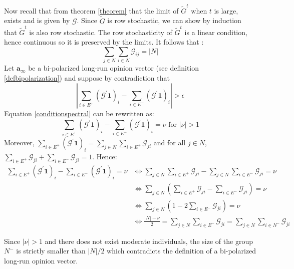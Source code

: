 \documentclass{article}
\begin{document}
\noindent Now recall that from theorem \ref{theorem} that the limit of $\tilde{G}^t$ when $t$ is large, exists and is given by $\mathcal{G}$. Since $\tilde{G}$ is row stochastic, we can show by induction that $\tilde{G}^t$ is also row stochastic. The row stochasticity of $\tilde{G}^t$ is a linear condition, hence continuous so it is preserved by the limits. It follows that : 
\begin{equation}
\sum_{j \in N} \sum_{i \in N} \mathcal{G}_{ij} = |N|
\label{sumone}
\end{equation}
Let $\mathbf{a}_{\infty}$ be a bi-polarized long-run opinion vector (see definition \ref{defbipolarization})  and suppose by contradiction that 
\begin{equation}
|\sum_{i \in E^{+}} (\mathcal{G}^{'} \mathbf{1})_{i} - \sum_{i \in E^{-}} (\mathcal{G}^{'} \mathbf{1})_{i}  | > \epsilon
\label{conditionspectral}
\end{equation} 
Equation \eqref{conditionspectral} can be rewritten as: 
\begin{equation*}  \sum_{i \in E^{+}} (\mathcal{G}^{'} \mathbf{1})_{i} - \sum_{i \in E^{-}} (\mathcal{G}^{'} \mathbf{1})_{i} = \nu \mbox{ for } |\nu| > 1 
\label{rewriteconditionspectral} \end{equation*}
Moreover, $ \sum_{i \in E^{+}} (\mathcal{G}^{'} \mathbf{1})_{i} = \sum_{j \in N} \sum_{i \in E^{+}} \mathcal{G}_{ji} $ and for all $j \in N$, $\sum_{i \in E^{+}} \mathcal{G}_{ji}  + \sum_{i \in E^{-}} \mathcal{G}_{ji} =1$. Hence: 
\begin{align*}
 \sum_{i \in E^{+}} (\mathcal{G}^{'} \mathbf{1})_{i} - \sum_{i \in E^{-}} (\mathcal{G}^{'} \mathbf{1})_{i} = \nu  & \Leftrightarrow    \sum_{j \in N} \sum_{i \in E^{+}} \mathcal{G}_{ji} - \sum_{j \in N} \sum_{i \in E^{-}} \mathcal{G}_{ji} = \nu \\
& \Leftrightarrow   \sum_{j \in N} ( \sum_{i \in E^{+}} \mathcal{G}_{ji} -  \sum_{i \in E^{-}} \mathcal{G}_{ji} ) = \nu \\
& \Leftrightarrow   \sum_{j \in N} ( 1 -  2 \sum_{i \in E^{-}} \mathcal{G}_{ji} ) = \nu \\
& \Leftrightarrow   \frac{|N| - \nu}{2}  = \sum_{j \in N}  \sum_{i \in E^{-}} \mathcal{G}_{ji}  = \sum_{j \in N}  \sum_{i \in N^{-}} \mathcal{G}_{ji}
\end{align*}

\noindent Since $|\nu| > 1$ and there does not exist moderate individuals, the size of the group $N^{-}$ is strictly smaller than $|N|/2$ which contradicts the definition of a bi-polarized long-run opinion vector.  
\end{document}
